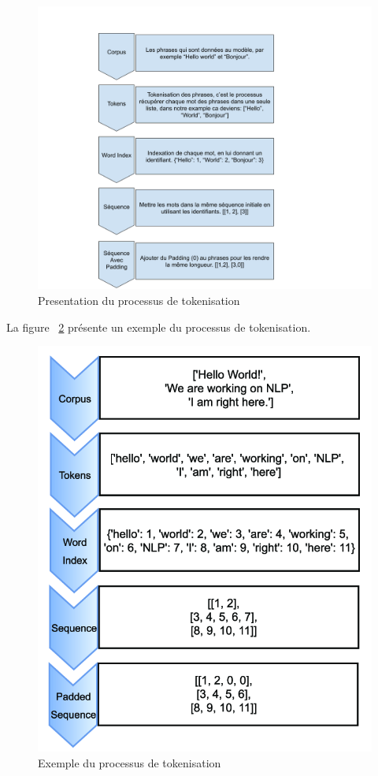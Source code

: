 \begin{figure}[H]
\centering
\includegraphics[width=1\textwidth]{logos/paddingexplanation.png}
\caption{Presentation du processus de tokenisation}
\label{fig:paddingexplanation}
\end{figure}

\noindent
La figure ~\ref{fig:padding} présente un exemple du processus de tokenisation.

\begin{figure}[H]
\centering
\includegraphics[width=1\textwidth]{logos/padding.png}
\caption{Exemple du processus de tokenisation}
\label{fig:padding}
\end{figure}

